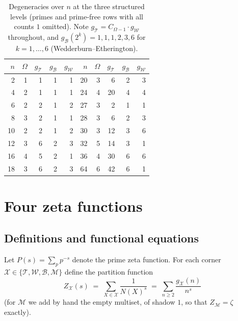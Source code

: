 \documentclass[11pt]{article}
\newcommand{\cT}{\mathcal{T}}   %
\newcommand{\cW}{\mathcal{W}}   %
\newcommand{\cB}{\mathcal{B}}   %
\newcommand{\cM}{\mathcal{M}}   %
\numberwithin{equation}{section}
\theoremstyle{plain}
\theoremstyle{definition}
\theoremstyle{remark}
\begin{document}
\begin{table}[ht]
\centering\small
\begin{tabular}{@{}rrrrr@{\hspace{9mm}}rrrrr@{}}
\toprule
$n$ & $\Omega$ & $g_\cT$ & $g_\cB$ & $g_\cW$ &
$n$ & $\Omega$ & $g_\cT$ & $g_\cB$ & $g_\cW$ \\
\midrule
 2 & 1 &  1 & 1 & 1 &  20 & 3 &  6 & 2 & 3 \\
 4 & 2 &  1 & 1 & 1 &  24 & 4 & 20 & 4 & 4 \\
 6 & 2 &  2 & 1 & 2 &  27 & 3 &  2 & 1 & 1 \\
 8 & 3 &  2 & 1 & 1 &  28 & 3 &  6 & 2 & 3 \\
10 & 2 &  2 & 1 & 2 &  30 & 3 & 12 & 3 & 6 \\
12 & 3 &  6 & 2 & 3 &  32 & 5 & 14 & 3 & 1 \\
16 & 4 &  5 & 2 & 1 &  36 & 4 & 30 & 6 & 6 \\
18 & 3 &  6 & 2 & 3 &  64 & 6 & 42 & 6 & 1 \\
\bottomrule
\end{tabular}
\caption{Degeneracies over $n$ at the three structured levels (primes and prime-free
rows with all counts $1$ omitted). Note $g_\cT = C_{\Omega-1}\cdot g_\cW$ throughout,
and $g_\cB(2^k) = 1,1,1,2,3,6$ for $k=1,\dots,6$ (Wedderburn--Etherington).}
\label{tab:degeneracies}
\end{table}

\section{Four zeta functions}\label{sec:zeta}

\subsection{Definitions and functional equations}

Let $P(s) = \sum_p p^{-s}$ denote the prime zeta function. For each corner
$\mathcal{X} \in \{\cT, \cW, \cB, \cM\}$ define the partition function
\[
Z_{\mathcal X}(s) \;=\; \sum_{X \in \mathcal X} \frac{1}{N(X)^{s}}
\;=\; \sum_{n \ge 2} \frac{g_{\mathcal X}(n)}{n^{s}}
\]
(for $\cM$ we add by hand the empty multiset, of shadow $1$, so that
$Z_\cM = \zeta$ exactly).
\end{document}
